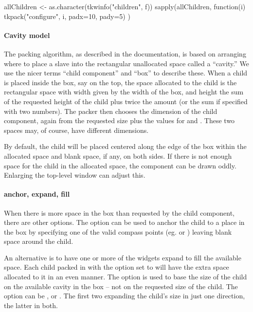 \begin{Schunk}
\begin{Sinput}
 allChildren <- as.character(tkwinfo("children", f))
 sapply(allChildren, function(i) {
   tkpack("configure", i,  padx=10, pady=5)
 })
\end{Sinput}
\end{Schunk}


\paragraph{Cavity model}
The packing algorithm, as described in the \Tk\/ documentation, is based
on arranging where to place a slave into the rectangular unallocated
space called a ``cavity.'' We use the nicer terms ``child component'' and ``box''
to describe these. When a child is placed inside the box, say on the
top, the space allocated to the child is the rectangular space with
width given by the width of the box, and height the sum of the
requested height of the child plus twice the  amount (or
the sum if specified with two numbers). The packer then chooses the
dimension of the child component, again from the requested size plus
the  values for  and . These two spaces
may, of course, have different dimensions.



By default, the child  will be placed centered along the edge of
the box within the allocated space and blank space, if any, on both
sides.  If there is not enough space for the child in the allocated
space, the component can be drawn oddly. Enlarging the top-level
window can adjust this. 



\paragraph{anchor, expand, fill} 
When there is more space in the box than requested by the child
component, there are other options. The  option
can be used to anchor the child to a place in the box by specifying
one of the valid compass points (eg.  or )
leaving blank space around the child. 


An alternative is to have one or more of the widgets expand to fill
the available space. Each child packed in with the 
option  set to  will have
the extra space allocated  to it in an even manner. The
 option is used to base the size of the child on
the available cavity in the box -- not on the requested size of the
child. The  option can be ,  or
. The first two expanding the child's size in just one
direction, the latter in both.

